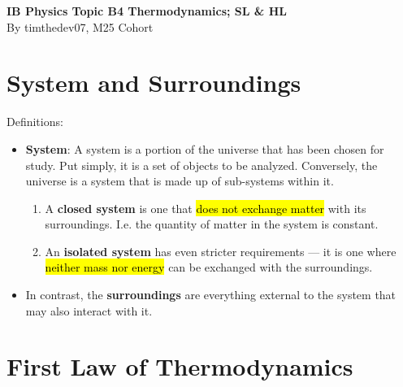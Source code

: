 \documentclass[a4paper,12pt]{article}
\let\oldsection\section
\renewcommand\section{\clearpage\oldsection}
\begin{document}
\pagestyle{fancy}


\begin{titlepage}
  \begin{center}

    \vspace*{8cm}
    \textbf{\Large {IB Physics Topic B4 Thermodynamics; SL \& HL}} \\
    \vspace*{1cm}
    \large{By timthedev07, M25 Cohort}

  \end{center}
\end{titlepage}

\pagebreak
\tableofcontents
\pagebreak

\clearpage
\setcounter{page}{1}

\section{System and Surroundings}

Definitions:
\begin{itemize}
  \item \textbf{System}: A system is a portion of the universe that has been chosen for study. Put simply, it is a set of objects to be analyzed. Conversely, the universe is a system that is made up of sub-systems within it.
        \begin{enumerate}
          \item A \textbf{closed system} is one that \hl{does not exchange matter} with its surroundings. I.e. the quantity of matter in the system is constant.
          \item An \textbf{isolated system} has even stricter requirements --- it is one where \hl{neither mass nor energy} can be exchanged with the surroundings.
        \end{enumerate}
  \item In contrast, the \textbf{surroundings} are everything external to the system that may also interact with it.
\end{itemize}

\section{First Law of Thermodynamics}
\end{document}
